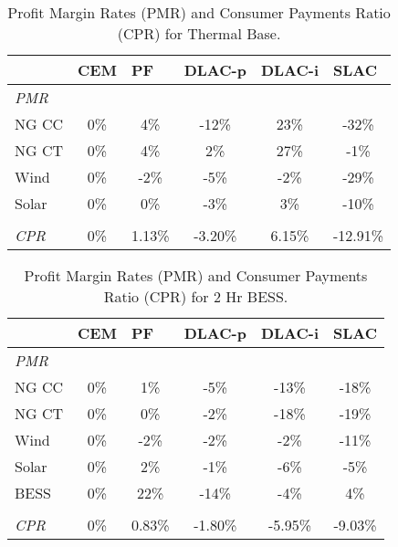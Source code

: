 \documentclass{article}
\begin{document}
\begin{table}[ht]
\centering
\begin{tabular}{lccccc}
\toprule
& \multicolumn{1}{l}{\textbf{CEM}} 
& \multicolumn{1}{l}{\textbf{PF}} 
& \multicolumn{1}{l}{\textbf{DLAC-p}} 
& \multicolumn{1}{l}{\textbf{DLAC-i}} 
& \multicolumn{1}{l}{\textbf{SLAC}} 
 \\ \hline
\midrule
\textit{PMR} & & & & \\
\quad NG CC & 0\% & 4\% & -12\% & 23\% & -32\% \\
\quad NG CT & 0\% & 4\% & 2\% & 27\% & -1\% \\
\quad Wind & 0\% & -2\% & -5\% & -2\% & -29\% \\
\quad Solar & 0\% & 0\% & -3\% & 3\% & -10\% \\
& & & & \\
\textit{CPR} & 0\% & 1.13\% & -3.20\% & 6.15\% & -12.91\% \\
\bottomrule
\end{tabular}
\caption{Profit Margin Rates (PMR) and Consumer Payments Ratio (CPR) for Thermal Base.}
\label{table:Thermal_Base_pmr}
\end{table}

\begin{table}[ht]
\centering
\begin{tabular}{lccccc}
\toprule
& \multicolumn{1}{l}{\textbf{CEM}} 
& \multicolumn{1}{l}{\textbf{PF}} 
& \multicolumn{1}{l}{\textbf{DLAC-p}} 
& \multicolumn{1}{l}{\textbf{DLAC-i}} 
& \multicolumn{1}{l}{\textbf{SLAC}} 
 \\ \hline
\midrule
\textit{PMR} & & & & \\
\quad NG CC & 0\% & 1\% & -5\% & -13\% & -18\% \\
\quad NG CT & 0\% & 0\% & -2\% & -18\% & -19\% \\
\quad Wind & 0\% & -2\% & -2\% & -2\% & -11\% \\
\quad Solar & 0\% & 2\% & -1\% & -6\% & -5\% \\
\quad BESS & 0\% & 22\% & -14\% & -4\% & 4\% \\
& & & & \\
\textit{CPR} & 0\% & 0.83\% & -1.80\% & -5.95\% & -9.03\% \\
\bottomrule
\end{tabular}
\caption{Profit Margin Rates (PMR) and Consumer Payments Ratio (CPR) for 2 Hr BESS.}
\label{table:2_Hr_BESS_pmr}
\end{table}
\end{document}
